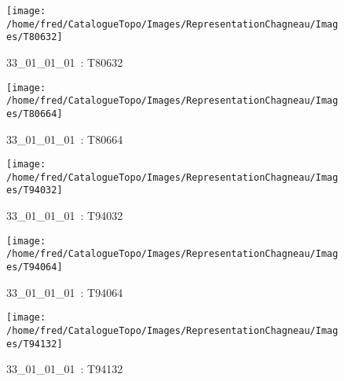 \documentclass[12pt,titlepage,oneside]{book}
\begin{document}
\begin{figure}[h!]
\begin{minipage}[t]{3cm}
\begin{center}
    \end{center}
  \end{minipage}
  \begin{minipage}[t]{3cm}
    \begin{center}
      \texttt{[image: /home/fred/CatalogueTopo/Images/RepresentationChagneau/Images/T80632]}
      \caption[~33\_01\_01\_01]{\small{33\_01\_01\_01~:} \tiny{T80632}}\label{T80632}
    \end{center}
  \end{minipage}
  \begin{minipage}[t]{3cm}
    \begin{center}
      \texttt{[image: /home/fred/CatalogueTopo/Images/RepresentationChagneau/Images/T80664]}
      \caption[~33\_01\_01\_01]{\small{33\_01\_01\_01~:} \tiny{T80664}}\label{T80664}
    \end{center}
  \end{minipage}
  \begin{minipage}[t]{3cm}
    \begin{center}
      \texttt{[image: /home/fred/CatalogueTopo/Images/RepresentationChagneau/Images/T94032]}
      \caption[~33\_01\_01\_01]{\small{33\_01\_01\_01~:} \tiny{T94032}}\label{T94032}
    \end{center}
  \end{minipage}
  \begin{minipage}[t]{3cm}
    \begin{center}
      \texttt{[image: /home/fred/CatalogueTopo/Images/RepresentationChagneau/Images/T94064]}
      \caption[~33\_01\_01\_01]{\small{33\_01\_01\_01~:} \tiny{T94064}}\label{T94064}
    \end{center}
  \end{minipage}
  \begin{minipage}[t]{3cm}
    \begin{center}
      \texttt{[image: /home/fred/CatalogueTopo/Images/RepresentationChagneau/Images/T94132]}
      \caption[~33\_01\_01\_01]{\small{33\_01\_01\_01~:} \tiny{T94132}}\label{T94132}
    \end{center}
  \end{minipage}
  \begin{minipage}[t]{3cm}
    \begin{center}

\end{center}
\end{minipage}
\end{figure}
\end{document}
